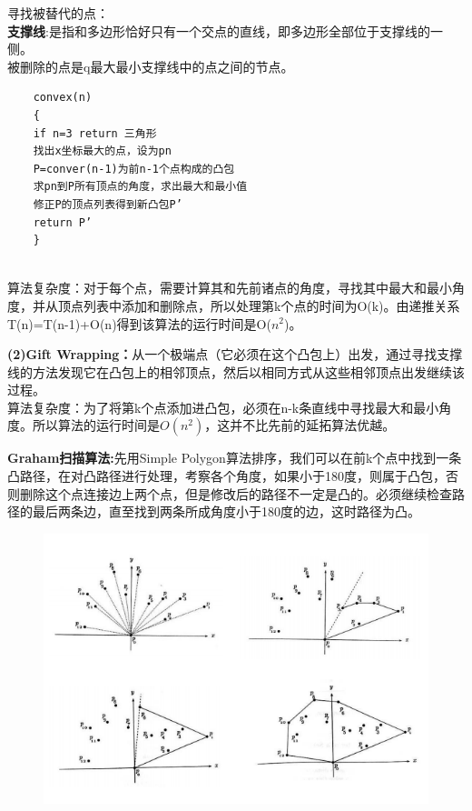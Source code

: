 \documentclass{article}
\begin{document}
    寻找被替代的点：\\
    \textbf{支撑线}:是指和多边形恰好只有一个交点的直线，即多边形全部位于支撑线的一侧。\\
    被删除的点是q最大最小支撑线中的点之间的节点。
                \lstset{language=C}
    \begin{lstlisting}
    convex(n)
    {
    if n=3 return 三角形
    找出x坐标最大的点，设为pn
    P=conver(n-1)为前n-1个点构成的凸包
    求pn到P所有顶点的角度，求出最大和最小值
    修正P的顶点列表得到新凸包P’
    return P’
    }
    
   \end{lstlisting}
   算法复杂度：对于每个点，需要计算其和先前诸点的角度，寻找其中最大和最小角度，并从顶点列表中添加和删除点，所以处理第k个点的时间为O(k)。由递推关系T(n)=T(n-1)+O(n)得到该算法的运行时间是O($n^2$)。 
   
   \textbf{(2)Gift Wrapping：}从一个极端点（它必须在这个凸包上）出发，通过寻找支撑线的方法发现它在凸包上的相邻顶点，然后以相同方式从这些相邻顶点出发继续该过程。\\
   算法复杂度：为了将第k个点添加进凸包，必须在n-k条直线中寻找最大和最小角度。所以算法的运行时间是$O(n^2)$，这并不比先前的延拓算法优越。
   
   
   \textbf{Graham扫描算法:}先用Simple Polygon算法排序，我们可以在前k个点中找到一条凸路径，在对凸路径进行处理，考察各个角度，如果小于180度，则属于凸包，否则删除这个点连接边上两个点，但是修改后的路径不一定是凸的。必须继续检查路径的最后两条边，直至找到两条所成角度小于180度的边，这时路径为凸。
      \begin{figure}[h]
 	\centering
 	\includegraphics[scale=0.6]{Graham.png}
    \end{figure}
    
\end{document}
